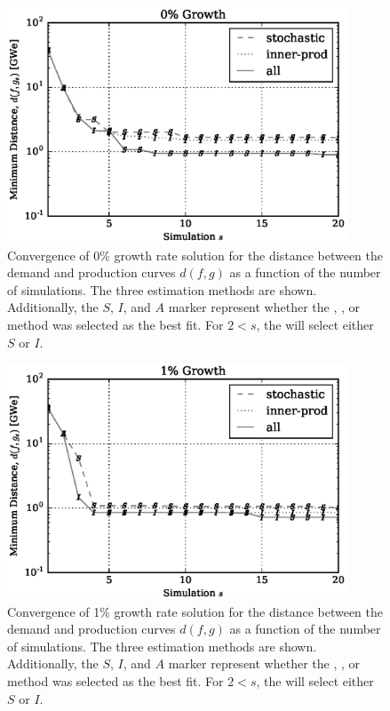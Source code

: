 \begin{figure}[htb]
\centering
\includegraphics[width=0.9\textwidth]{converge-0per.eps}
\caption{Convergence of 0\% growth rate solution for the distance between
the demand and production curves $d(f, g)$ as a function of the number of
simulations. The three estimation methods are shown. Additionally, the
$S$, $I$, and $A$ marker represent whether the \stochastic, \innerprod,
or \allflag method was selected as the best fit. For $2 < s$, the \allflag
will select either $S$ or $I$.
}
\label{converge-0per}
\end{figure}

\begin{figure}[htb]
\centering
\includegraphics[width=0.9\textwidth]{converge-1per.eps}
\caption{Convergence of 1\% growth rate solution for the distance between
the demand and production curves $d(f, g)$ as a function of the number of
simulations. The three estimation methods are shown. Additionally, the
$S$, $I$, and $A$ marker represent whether the \stochastic, \innerprod,
or \allflag method was selected as the best fit. For $2 < s$, the \allflag
will select either $S$ or $I$.
}
\label{converge-1per}
\end{figure}

